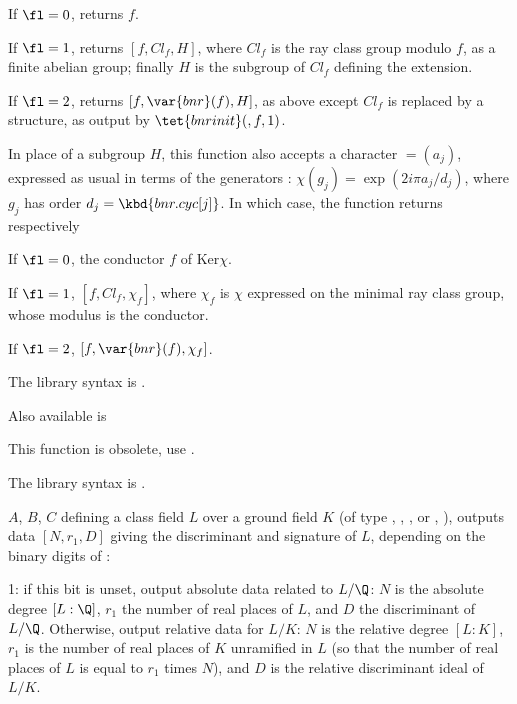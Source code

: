 If $\fl = 0$, returns $f$.

If $\fl = 1$, returns $[f, Cl_f, H]$, where $Cl_f$ is the ray class group
modulo $f$, as a finite abelian group; finally $H$ is the subgroup of $Cl_f$
defining the extension.

If $\fl = 2$, returns $[f, \var{bnr}(f), H]$, as above except $Cl_f$ is
replaced by a  structure, as output by $\tet{bnrinit}(,f,1)$.

In place of a subgroup $H$, this function also accepts a character
  $=(a_j)$, expressed as usual in terms of the generators
: $\chi(g_j) = \exp(2i\pi a_j / d_j)$, where $g_j$ has
order $d_j = \kbd{bnr.cyc[j]}$. In which case, the function returns
respectively

If $\fl = 0$, the conductor $f$ of $\text{Ker} \chi$.

If $\fl = 1$, $[f, Cl_f, \chi_f]$, where $\chi_f$ is $\chi$ expressed
on the minimal ray class group, whose modulus is the conductor.

If $\fl = 2$, $[f, \var{bnr}(f), \chi_f]$.

The library syntax is .

Also available is 

\label{se:bnrconductorofchar}
This function is obsolete, use .

The library syntax is .

\label{se:bnrdisc}
$A$, $B$, $C$ defining a class field $L$ over a ground field $K$
(of type ,
,
,
 or
,
), outputs data $[N,r_1,D]$ giving the discriminant and
signature of $L$, depending on the binary digits of \fl:

\item 1: if this bit is unset, output absolute data related to $L/\Q$:
$N$ is the absolute degree $[L:\Q]$, $r_1$ the number of real places of $L$,
and $D$ the discriminant of $L/\Q$. Otherwise, output relative data for $L/K$:
$N$ is the relative degree $[L:K]$, $r_1$ is the number of real places of $K$
unramified in $L$ (so that the number of real places of $L$ is equal to $r_1$
times $N$), and $D$ is the relative discriminant ideal of $L/K$.

